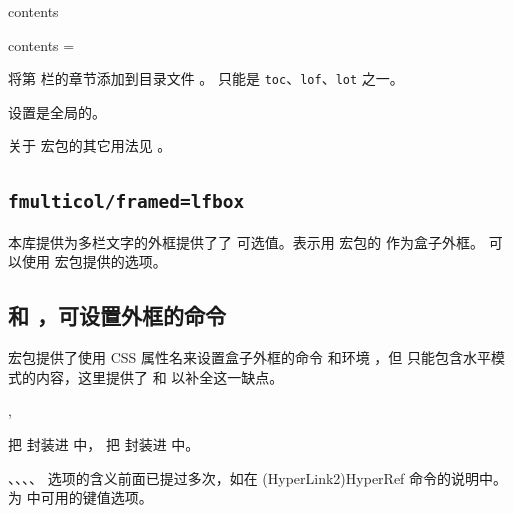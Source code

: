 \documentclass{cusdoc}
\begin{document}
\begin{keyval}[path=paracol]{contents}
  \begin{syntax}
    contents =  
  \end{syntax}
  将第  栏的章节添加到目录文件 。 只能是 \texttt{toc}、\texttt{lof}、\texttt{lot} 之一。

  设置是全局的。
\end{keyval}

关于  宏包的其它用法见 。

\subsection{\texttt{fmulticol/framed=lfbox}}\label{sec:fmulticol/framed=lfbox}

本库提供为多栏文字的外框提供了了  可选值。表示用  宏包的 
 作为盒子外框。 可以使用  
宏包提供的选项。

\subsection{ 和 ，可设置外框的命令}
\label{sec:fparbox-fvarbox}

 宏包提供了使用 CSS 属性名来设置盒子外框的命令  和环境 ，但  只能包含水平模式的内容，这里提供了  和  以补全这一缺点。

\begin{function}{\fparbox,\fvarbox}
  \begin{syntax}
    \V\fparbox {} 
    \V\fparbox {}     
    \V\fvarbox {} 
    \V\fvarbox {}     
  \end{syntax}

 把  封装进  中， 把  封装进  中。

、、、、 选项的含义前面已提过多次，如在 \csref(HyperLink2){HyperRef} 命令的说明中。 为  中可用的键值选项。
\end{function}
\end{document}
